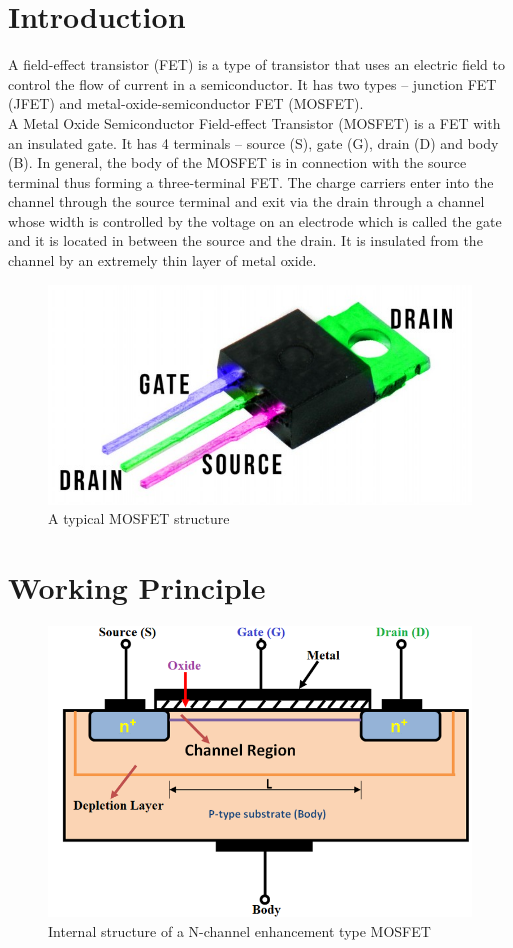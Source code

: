 \section*{Introduction}
A field-effect transistor (FET) is a type of transistor that uses an electric field to control the flow of current in a semiconductor. It has two types -- junction FET (JFET) and metal-oxide-semiconductor FET (MOSFET). \\

A Metal Oxide Semiconductor Field-effect Transistor (MOSFET) is a FET with an insulated gate. It has 4 terminals -- source (S), gate (G), drain (D) and body (B). In general, the body of the MOSFET is in connection with the source terminal thus forming a three-terminal FET. The charge carriers enter into the channel through the source terminal and exit via the drain through a channel whose width is controlled by the voltage on an electrode which is called the gate and it is located in between the source and the drain. It is insulated from the channel by an extremely thin layer of metal oxide.

\begin{figure}[H]
    \centering
    \includegraphics[width=0.6\columnwidth]{images/real.jpg}
    \caption{A typical MOSFET structure}
\end{figure}

\section*{Working Principle}

\begin{figure}[H]
    \centering
    \includegraphics[width=0.75\columnwidth]{images/str.png}
    \caption{Internal structure of a N-channel enhancement type MOSFET}
    \label{str}
\end{figure}

